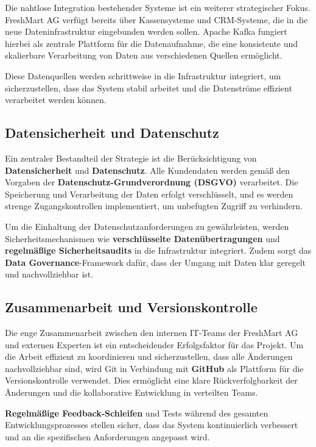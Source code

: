 \documentclass[%
pdftex,
oneside,			%
11pt,				%
parskip=half,		%
headheight = 12pt,	%
headsepline,		%
footsepline,		%
footheight = 16pt,	%
abstracton,		%
DIV=calc,		%
BCOR=8mm,		%
headinclude=false,	%
footinclude=false,	%
listof=totoc,		%
toc=bibliography,	%
]{scrreprt}	%
\begin{document}
        Die nahtlose Integration bestehender Systeme ist ein weiterer strategischer Fokus. 
        FreshMart AG verfügt bereits über Kassensysteme und CRM-Systeme, die in die neue Dateninfrastruktur eingebunden werden sollen. 
        Apache Kafka fungiert hierbei als zentrale Plattform für die Datenaufnahme, die eine konsistente und skalierbare Verarbeitung von Daten aus verschiedenen Quellen ermöglicht.

        Diese Datenquellen werden schrittweise in die Infrastruktur integriert, um sicherzustellen, dass das System stabil arbeitet und die Datenströme effizient verarbeitet werden können.

    \subsection{Datensicherheit und Datenschutz}

        Ein zentraler Bestandteil der Strategie ist die Berücksichtigung von \textbf{Datensicherheit} und \textbf{Datenschutz}. 
        Alle Kundendaten werden gemäß den Vorgaben der \textbf{Datenschutz-Grundverordnung (DSGVO)} verarbeitet. 
        Die Speicherung und Verarbeitung der Daten erfolgt verschlüsselt, und es werden strenge Zugangskontrollen implementiert, um unbefugten Zugriff zu verhindern.

        Um die Einhaltung der Datenschutzanforderungen zu gewährleisten, werden Sicherheitsmechanismen wie \textbf{verschlüsselte Datenübertragungen} und \textbf{regelmäßige Sicherheitsaudits} in die Infrastruktur integriert. Zudem sorgt das \textbf{Data Governance}-Framework dafür, dass der Umgang mit Daten klar geregelt und nachvollziehbar ist.

    \subsection{Zusammenarbeit und Versionskontrolle}

        Die enge Zusammenarbeit zwischen den internen IT-Teams der FreshMart AG und externen Experten ist ein entscheidender Erfolgsfaktor für das Projekt. 
        Um die Arbeit effizient zu koordinieren und sicherzustellen, dass alle Änderungen nachvollziehbar sind, wird Git in Verbindung mit \textbf{GitHub} als Plattform für die Versionskontrolle verwendet. 
        Dies ermöglicht eine klare Rückverfolgbarkeit der Änderungen und die kollaborative Entwicklung in verteilten Teams.

        \textbf{Regelmäßige Feedback-Schleifen} und Tests während des gesamten Entwicklungsprozesses stellen sicher, dass das System kontinuierlich verbessert und an die spezifischen Anforderungen angepasst wird.
\end{document}

